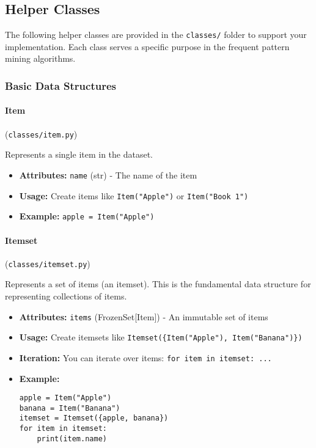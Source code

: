 \documentclass[
english,
smallborders
]{i6prcsht}
\begin{document}
\newpage

\subsection*{Helper Classes}

The following helper classes are provided in the \texttt{classes/} folder to support your implementation. Each class serves a specific purpose in the frequent pattern mining algorithms.

\vspace*{0.5cm}

\subsubsection*{Basic Data Structures}

\paragraph{Item} (\texttt{classes/item.py})

Represents a single item in the dataset.

\begin{itemize}
	\item \textbf{Attributes:} \texttt{name} (str) - The name of the item
	\item \textbf{Usage:} Create items like \texttt{Item("Apple")} or \texttt{Item("Book 1")}
	\item \textbf{Example:} \texttt{apple = Item("Apple")}
\end{itemize}

\vspace*{0.3cm}

\paragraph{Itemset} (\texttt{classes/itemset.py})

Represents a set of items (an itemset). This is the fundamental data structure for representing collections of items.

\begin{itemize}
	\item \textbf{Attributes:} \texttt{items} (FrozenSet[Item]) - An immutable set of items
	\item \textbf{Usage:} Create itemsets like \texttt{Itemset(\{Item("Apple"), Item("Banana")\})}
	\item \textbf{Iteration:} You can iterate over items: \texttt{for item in itemset: ...}
	\item \textbf{Example:}
	      \begin{lstlisting}
apple = Item("Apple")
banana = Item("Banana")
itemset = Itemset({apple, banana})
for item in itemset:
    print(item.name)
    \end{lstlisting}
\end{itemize}
\end{document}

